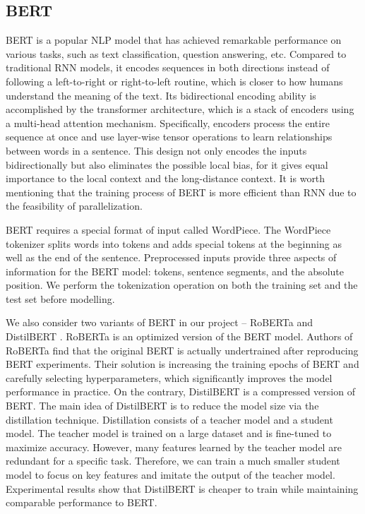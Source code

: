 \documentclass[runningheads]{llncs}
\begin{document}
\subsection{BERT}
BERT \cite{bert} is a popular NLP model that has achieved remarkable performance on various tasks, such as text classification, question answering, etc. Compared to traditional RNN models, it encodes sequences in both directions instead of following a left-to-right or right-to-left routine, which is closer to how humans understand the meaning of the text. Its bidirectional encoding ability is accomplished by the transformer architecture, which is a stack of encoders using a multi-head attention mechanism. Specifically, encoders process the entire sequence at once and use layer-wise tensor operations to learn relationships between words in a sentence. This design not only encodes the inputs bidirectionally but also eliminates the possible local bias, for it gives equal importance to the local context and the long-distance context. It is worth mentioning that the training process of BERT is more efficient than RNN due to the feasibility of parallelization.

BERT requires a special format of input called WordPiece. The WordPiece tokenizer splits words into tokens and adds special tokens at the beginning as well as the end of the sentence. Preprocessed inputs provide three aspects of information for the BERT model: tokens, sentence segments, and the absolute position. We perform the tokenization operation on both the training set and the test set before modelling.

We also consider two variants of BERT in our project -- RoBERTa \cite{roberta} and DistilBERT \cite{distilbert}. RoBERTa is an optimized version of the BERT model. Authors of RoBERTa find that the original BERT is actually undertrained after reproducing BERT experiments. Their solution is increasing the training epochs of BERT and carefully selecting hyperparameters, which significantly improves the model performance in practice. On the contrary, DistilBERT is a compressed version of BERT. The main idea of DistilBERT is to reduce the model size via the distillation technique. Distillation consists of a teacher model and a student model. The teacher model is trained on a large dataset and is fine-tuned to maximize accuracy. However, many features learned by the teacher model are redundant for a specific task. Therefore, we can train a much smaller student model to focus on key features and imitate the output of the teacher model. Experimental results show that DistilBERT is cheaper to train while maintaining comparable performance to BERT.
\end{document}

